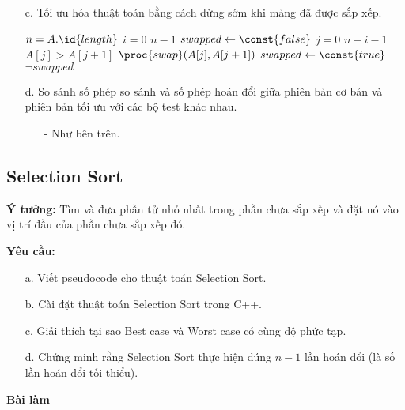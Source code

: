 \documentclass[12pt,a4paper]{article}
\begin{document}
\begin{enumerate}
    \item[c.] Tối ưu hóa thuật toán bằng cách dừng sớm khi mảng đã được sắp xếp.
    \begin{codebox}
            \li $n = A.\id{length}$
            \li \For $i = 0$ \To $n - 1$
                \Do
                    \li $swapped \gets \const{false}$
                    \li \For $j = 0$ \To $n - i - 1$
                        \Do
                            \li \If $A[j] > A[j + 1]$
                            \Then
                                \li $\proc{swap}(A[j], A[j + 1])$
                                \li $swapped \gets \const{true}$
                            \End
                        \End
                    \li \If $\lnot swapped$
                        \Then
                            \li \Return
                        \End
                \End
    \end{codebox}
    \item[d.] So sánh số phép so sánh và số phép hoán đổi giữa phiên bản cơ bản 
              và phiên bản tối ưu với các bộ test khác nhau.
    \begin{enumerate}
        \item[-] Như bên trên. 
    \end{enumerate}
\end{enumerate}



\subsection{Selection Sort}
\textbf{Ý tưởng: }Tìm và đưa phần tử nhỏ nhất trong phần chưa sắp xếp và đặt nó vào 
vị trí đầu của phần chưa sắp xếp đó.

\textbf{Yêu cầu:}
\begin{enumerate}
    \item[a.] Viết pseudocode cho thuật toán Selection Sort.
    \item[b.] Cài đặt thuật toán Selection Sort trong C++.
    \item[c.] Giải thích tại sao Best case và Worst case có cùng độ phức tạp.
    \item[d.] Chứng minh rằng Selection Sort thực hiện đúng $n - 1$ lần hoán đổi (là số lần hoán đổi tối thiểu).
\end{enumerate}

\begin{center}
    \textbf{Bài làm}
\end{center}
\end{document}
